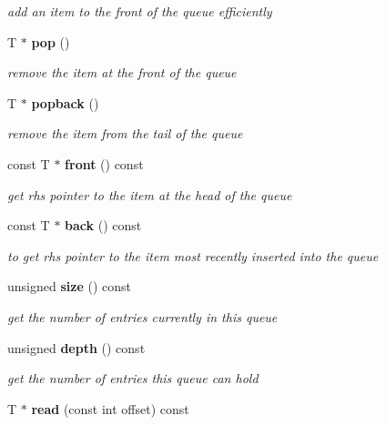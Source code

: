 \begin{CompactItemize}
\begin{CompactList}\small\item\em add an item to the front of the queue efficiently \item\end{CompactList}\item 
T $\ast$ {\bf pop} ()
\begin{CompactList}\small\item\em remove the item at the front of the queue \item\end{CompactList}\item 
T $\ast$ {\bf popback} ()
\begin{CompactList}\small\item\em remove the item from the tail of the queue \item\end{CompactList}\item 
const T $\ast$ {\bf front} () const 
\begin{CompactList}\small\item\em get rhs pointer to the item at the head of the queue \item\end{CompactList}\item 
const T $\ast$ {\bf back} () const \label{class_d_r_a_msim_i_i_1_1_queue_e4969b401ba2c7b37f0becdcce115390}

\begin{CompactList}\small\item\em to get rhs pointer to the item most recently inserted into the queue \item\end{CompactList}\item 
unsigned {\bf size} () const \label{class_d_r_a_msim_i_i_1_1_queue_52a5a98afc0edac59cfcd4efac0569c4}

\begin{CompactList}\small\item\em get the number of entries currently in this queue \item\end{CompactList}\item 
unsigned {\bf depth} () const \label{class_d_r_a_msim_i_i_1_1_queue_193465ae95b739f1d55206fa6630856f}

\begin{CompactList}\small\item\em get the number of entries this queue can hold \item\end{CompactList}\item 
T $\ast$ {\bf read} (const int offset) const \label{class_d_r_a_msim_i_i_1_1_queue_594030f83e50b8b97a3c1633394d5715}


\end{CompactItemize}
